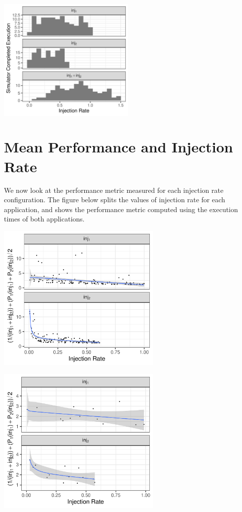 \documentclass[a4paper]{article}
\begin{document}
\begin{center}
\includegraphics[width=0.5\textwidth]{./img/2_apps_min_mean_time/rs_20_samples_10_iterations_histogram_success_weighted_full.pdf}
\end{center}

\section{Mean Performance and Injection Rate}
\label{sec:orgc5d875d}
We  now  look  at  the  performance metric  measured  for  each  injection  rate
configuration.  The  figure below splits the  values of injection rate  for each
application, and shows the performance metric computed using the execution times
of both applications.

\begin{center}
\includegraphics[width=0.6\textwidth]{./img/2_apps_min_mean_time/rs_20_samples_10_iterations_scatter_weighted_full.pdf}
\end{center}

\begin{center}
\includegraphics[width=0.6\textwidth]{./img/2_apps_min_mean_time/rs_20_samples_10_iterations_scatter_weighted_full_single.pdf}
\end{center}
\end{document}
